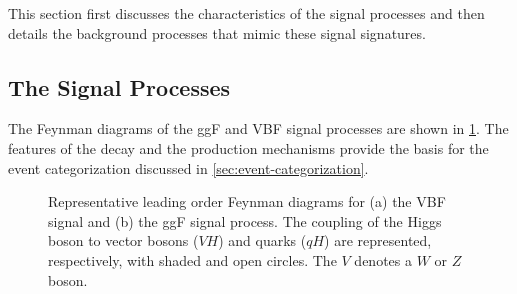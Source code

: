 This section first discusses the characteristics of the signal processes and then details the background processes that mimic these signal signatures.

\subsection{The Signal Processes}
\label{subsec:signal-bkg-characterisation}
The Feynman diagrams of the ggF and VBF signal processes are shown in \cref{fig:feyn:sig-wwprod}.
The features of the \HWWdet decay and the production mechanisms provide the basis for the event categorization discussed in \cref{sec:event-categorization}. 

\begin{figure}[t]
    \caption{Representative leading order Feynman diagrams for (a) the VBF signal and (b) the ggF signal process. The coupling of the Higgs boson to vector bosons ($VH$) and quarks ($qH$) are represented, respectively, with shaded and open circles. The $V$ denotes a $W$ or $Z$ boson.} 
    \label{fig:feyn:sig-wwprod}
\end{figure}



